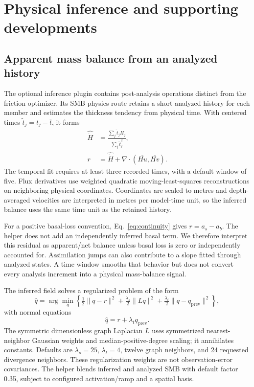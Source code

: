 \documentclass[11pt,a4paper]{article}
\begin{document}
\section{Physical inference and supporting developments}\label{sec:developments}
\subsection{Apparent mass balance from an analyzed history}
The optional inference plugin contains post-analysis operations distinct from the friction optimizer. Its SMB physics route retains a short analyzed history for each member and estimates the thickness tendency from physical time. With centered times \(\widetilde t_j=t_j-\bar t\), it forms
\begin{align}
 \widehat{\dot H}&=\frac{\sum_j\widetilde t_j H_j}
                              {\sum_j\widetilde t_j^2},\\
 r&=\widehat{\dot H}+\nabla\!\cdot
          \left(\overline{Hu},\overline{Hv}\right).
 \label{eq:smbresidual}
\end{align}
The temporal fit requires at least three recorded times, with a default window of five. Flux derivatives use weighted quadratic moving-least-squares reconstructions on neighboring physical coordinates. Coordinates are scaled to metres and depth-averaged velocities are interpreted in metres per model-time unit, so the inferred balance uses the same time unit as the retained history.

For a positive basal-loss convention, Eq.~\ref{eq:continuity} gives \(r=a_s-a_b\). The helper does not add an independently inferred basal term. We therefore interpret this residual as apparent/net balance unless basal loss is zero or independently accounted for. Assimilation jumps can also contribute to a slope fitted through analyzed states. A time window smooths that behavior but does not convert every analysis increment into a physical mass-balance signal.

The inferred field solves a regularized problem of the form
\begin{equation}
 \widehat q=\arg\min_q\left\{
 \tfrac12\|q-r\|^2+\tfrac{\lambda_s}{2}\|Lq\|^2
 +\tfrac{\lambda_t}{2}\|q-q_{\mathrm{prev}}\|^2\right\},
\end{equation}
with normal equations
\begin{equation}
 [(1+\lambda_t)I+\lambda_s L^TL]\widehat q
          =r+\lambda_t q_{\mathrm{prev}}.
 \label{eq:smbregularization}
\end{equation}
The symmetric dimensionless graph Laplacian \(L\) uses symmetrized nearest-neighbor Gaussian weights and median-positive-degree scaling; it annihilates constants. Defaults are \(\lambda_s=25\), \(\lambda_t=4\), twelve graph neighbors, and 24 requested divergence neighbors. These regularization weights are not observation-error covariances. The helper blends inferred and analyzed SMB with default factor 0.35, subject to configured activation/ramp and a spatial basis.
\end{document}
